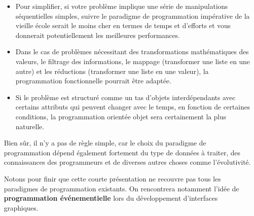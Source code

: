 \documentclass[
  letterpaper,
  DIV=11,
  numbers=noendperiod]{scrartcl}
\providecommand{\tightlist}{%
  \setlength{\itemsep}{0pt}\setlength{\parskip}{0pt}}\usepackage{longtable,booktabs,array}
\begin{document}
\begin{itemize}
\tightlist
\item
  Pour simplifier, si votre problème implique une série de manipulations
  séquentielles simples, suivre le paradigme de programmation impérative
  de la vieille école serait le moins cher en termes de temps et
  d'efforts et vous donnerait potentiellement les meilleures
  performances.
\item
  Dans le cas de problèmes nécessitant des transformations mathématiques
  des valeurs, le filtrage des informations, le mappage (transformer une
  liste en une autre) et les réductions (transformer une liste en une
  valeur), la programmation fonctionnelle pourrait être adaptée.
\item
  Si le problème est structuré comme un tas d'objets interdépendants
  avec certains attributs qui peuvent changer avec le temps, en fonction
  de certaines conditions, la programmation orientée objet sera
  certainement la plus naturelle.
\end{itemize}

Bien sûr, il n'y a pas de règle simple, car le choix du paradigme de
programmation dépend également fortement du type de données à traiter,
des connaissances des programmeurs et de diverses autres choses comme
l'évolutivité.

Notons pour finir que cette courte présentation ne recouvre pas tous les
paradigmes de programmation existants. On rencontrera notamment l'idée
de \textbf{programmation événementielle} lors du développement
d'interfaces graphiques.
\end{document}

